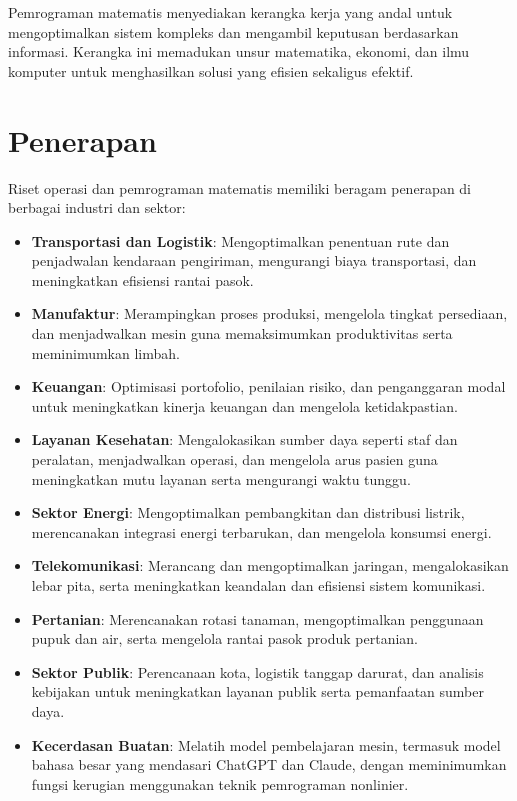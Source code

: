 Pemrograman matematis menyediakan kerangka kerja yang andal untuk mengoptimalkan sistem kompleks dan mengambil keputusan berdasarkan informasi. Kerangka ini memadukan unsur matematika, ekonomi, dan ilmu komputer untuk menghasilkan solusi yang efisien sekaligus efektif.

\section{Penerapan}

Riset operasi dan pemrograman matematis memiliki beragam penerapan di berbagai industri dan sektor:

\begin{itemize}
    \item \textbf{Transportasi dan Logistik}: Mengoptimalkan penentuan rute dan penjadwalan kendaraan pengiriman, mengurangi biaya transportasi, dan meningkatkan efisiensi rantai pasok.
    \item \textbf{Manufaktur}: Merampingkan proses produksi, mengelola tingkat persediaan, dan menjadwalkan mesin guna memaksimumkan produktivitas serta meminimumkan limbah.
    \item \textbf{Keuangan}: Optimisasi portofolio, penilaian risiko, dan penganggaran modal untuk meningkatkan kinerja keuangan dan mengelola ketidakpastian.
    \item \textbf{Layanan Kesehatan}: Mengalokasikan sumber daya seperti staf dan peralatan, menjadwalkan operasi, dan mengelola arus pasien guna meningkatkan mutu layanan serta mengurangi waktu tunggu.
    \item \textbf{Sektor Energi}: Mengoptimalkan pembangkitan dan distribusi listrik, merencanakan integrasi energi terbarukan, dan mengelola konsumsi energi.
    \item \textbf{Telekomunikasi}: Merancang dan mengoptimalkan jaringan, mengalokasikan lebar pita, serta meningkatkan keandalan dan efisiensi sistem komunikasi.
    \item \textbf{Pertanian}: Merencanakan rotasi tanaman, mengoptimalkan penggunaan pupuk dan air, serta mengelola rantai pasok produk pertanian.
    \item \textbf{Sektor Publik}: Perencanaan kota, logistik tanggap darurat, dan analisis kebijakan untuk meningkatkan layanan publik serta pemanfaatan sumber daya.
    \item \textbf{Kecerdasan Buatan}: Melatih model pembelajaran mesin, termasuk model bahasa besar yang mendasari ChatGPT dan Claude, dengan meminimumkan fungsi kerugian menggunakan teknik pemrograman nonlinier.
\end{itemize}

